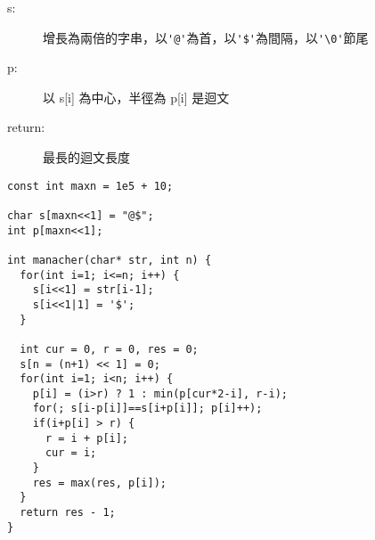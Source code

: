 \begin{description}
    \item [s:] 增長為兩倍的字串，以\verb|'@'|為首，以\verb|'$'|為間隔，以\verb|'\0'|節尾
    \item [p:] 以 s[i] 為中心，半徑為 p[i] 是迴文
    \item [return:] 最長的迴文長度
\end{description}
\begin{lstlisting}
const int maxn = 1e5 + 10;

char s[maxn<<1] = "@$";
int p[maxn<<1];

int manacher(char* str, int n) {
  for(int i=1; i<=n; i++) {
    s[i<<1] = str[i-1];
    s[i<<1|1] = '$';
  }

  int cur = 0, r = 0, res = 0;
  s[n = (n+1) << 1] = 0;
  for(int i=1; i<n; i++) {
    p[i] = (i>r) ? 1 : min(p[cur*2-i], r-i);
    for(; s[i-p[i]]==s[i+p[i]]; p[i]++);
    if(i+p[i] > r) {
      r = i + p[i];
      cur = i;
    }
    res = max(res, p[i]);
  }
  return res - 1;
}
\end{lstlisting}